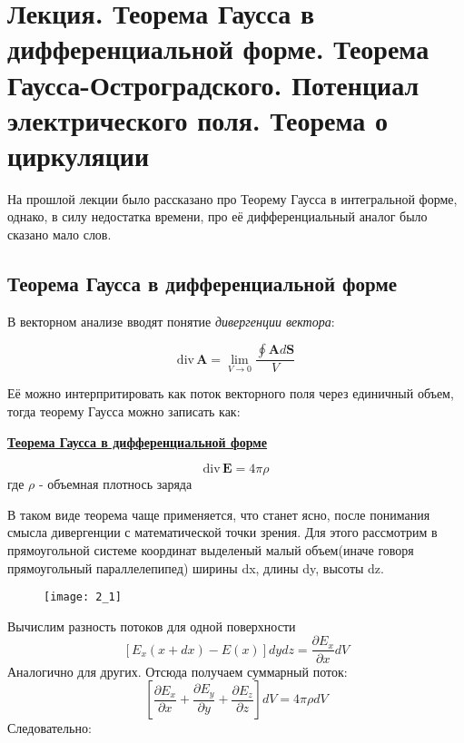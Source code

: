 \section{Лекция. Теорема Гаусса в дифференциальной форме. Теорема Гаусса-Остроградского. Потенциал электрического поля. Теорема о циркуляции}

На прошлой лекции было рассказано про Теорему Гаусса в интегральной форме, однако, в силу недостатка времени, про её дифференциальный аналог было сказано мало слов.

\subsection{Теорема Гаусса в дифференциальной форме}

В векторном анализе вводят понятие \textit{дивергенции вектора}:

\begin{equation}\label{opr1}
\mathrm{div\,} \textbf{A} = \lim_{V \rightarrow 0} \frac{\oint \textbf{A}d\textbf{S}}{V}
\end{equation}

Её можно интерпритировать как поток векторного поля через единичный объем, тогда теорему Гаусса можно записать как:

\colorbox{faded}{\underline{\textbf{Теорема Гаусса в дифференциальной форме}}}

\begin{equation}\label{opr2}
\mathrm{div\,} \textbf{E} = 4\pi\rho 
\end{equation}
где $\rho$ - объемная плотнось заряда

В таком виде теорема чаще применяется, что станет ясно, после понимания смысла дивергенции с математической точки зрения.
Для этого рассмотрим в прямоугольной системе координат выделеный малый объем(иначе говоря прямоугольный параллелепипед) ширины dx, длины dy, высоты dz.

\begin{figure}[!ht]
\centering
 \texttt{[image: 2\_1]}     
 \label{fig:my_label}
 \caption{}
\end{figure}

Вычислим разность потоков для одной поверхности 
$$
[E_x(x + dx) - E(x)]dydz = \frac{\partial E_x}{\partial x}dV
$$
Аналогично для других. Отсюда получаем суммарный поток:
$$
\left[\frac{\partial E_x}{\partial x} + \frac{\partial E_y}{\partial y} + \frac{\partial E_z}{\partial z} \right] dV = 4 \pi \rho dV
$$
Следовательно:

